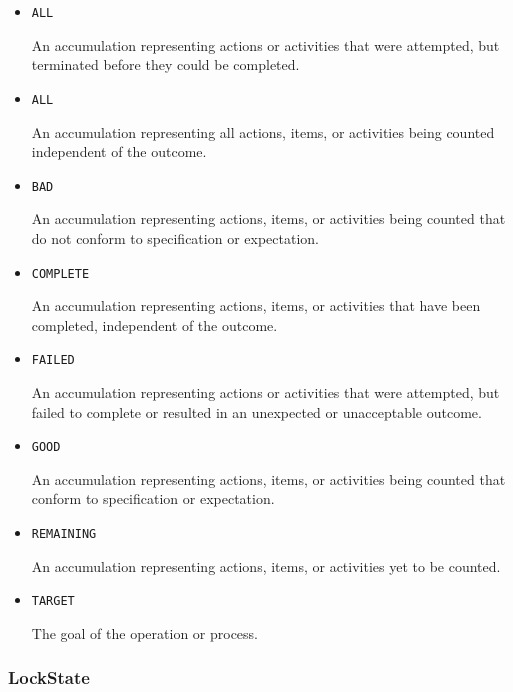 \begin{itemize}

\item \texttt{ALL}


An accumulation representing actions or activities that were attempted, but terminated before they could be completed.

\item \texttt{ALL}


An accumulation representing all actions, items, or activities being counted independent of the outcome.

\item \texttt{BAD}


An accumulation representing actions, items, or activities being counted that do not conform to specification or expectation.

\item \texttt{COMPLETE}


An accumulation representing actions, items, or activities that have been completed, independent of the outcome.

\item \texttt{FAILED}


An accumulation representing actions or activities that were attempted, but failed to
complete or resulted in an unexpected or unacceptable outcome.

\item \texttt{GOOD}


An accumulation representing actions, items, or activities being counted that conform to specification or expectation.

\item \texttt{REMAINING}


An accumulation representing actions, items, or activities yet to be counted.

\item \texttt{TARGET}


The goal of the operation or process.


\end{itemize}











\subsubsection{LockState}
\label{sec:LockState}



